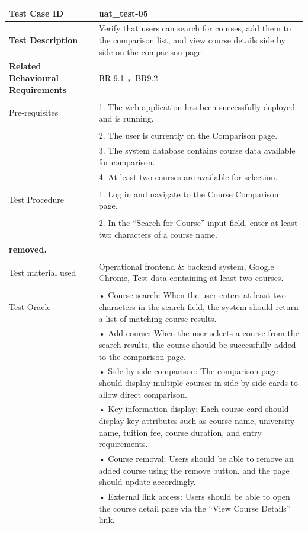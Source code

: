 \begin{table}[h]
\begin{tabularx}{\linewidth}{>{\bfseries}l X}
\hline
Test Case ID & uat\_test-05 \\ \hline

Test Description & Verify that users can search for courses, add them to the comparison list, and view course details side by side on the comparison page.\\ \hline
Related Behavioural Requirements & BR 9.1 ，BR9.2 \\ \hline

Pre-requisites & 1. The web application has been successfully deployed and is running.\\
& 2. The user is currently on the Comparison page.\\
&3. The system database contains course data available for comparison.\\
&4. At least two courses are available for selection. \\ \hline

Test Procedure & 1. Log in and navigate to the Course Comparison page.\\
&2. In the “Search for Course” input field, enter at least two characters of a course name.\\
removed.\\\hline

Test material used & Operational frontend \& backend system, Google Chrome, Test data containing at least two courses. \\ \hline

Test Oracle & • Course search: When the user enters at least two characters in the search field, the system should return a list of matching course results.\\
&• Add course: When the user selects a course from the search results, the course should be successfully added to the comparison page.\\
&• Side-by-side comparison: The comparison page should display multiple courses in side-by-side cards to allow direct comparison.\\ 
& • Key information display: Each course card should display key attributes such as course name, university name, tuition fee, course duration, and entry requirements.\\
& • Course removal: Users should be able to remove an added course using the remove button, and the page should update accordingly.\\
& • External link access: Users should be able to open the course detail page via the “View Course Details” link.\\



\end{tabularx}
\end{table}
